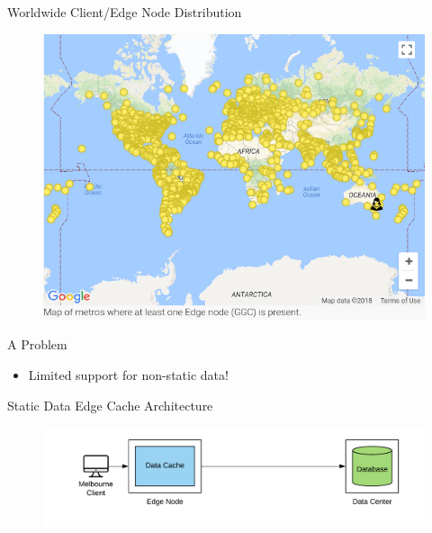 \documentclass[10pt]{beamer}
\begin{document}
\begin{frame}{Worldwide Client/Edge Node Distribution}
    \begin{figure}
        \center
        \includegraphics[scale=0.45]{apollo_google_oceania_en}
    \end{figure}
\end{frame}

\begin{frame}{A Problem}
    \begin{itemize}
        \item{Limited support for non-static data!}
    \end{itemize}
    \vspace{1cm}
\end{frame}

\begin{frame}{Static Data Edge Cache Architecture}
    \begin{figure}
        \center
        \hspace*{-1.5cm}
        \includegraphics[scale=0.17]{apollo_ec_dbl_0}
    \end{figure}
\end{frame}
\end{document}
